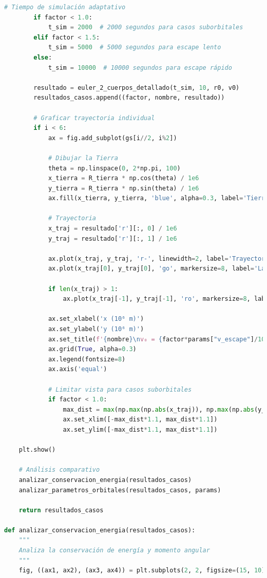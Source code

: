 \documentclass{article}
\begin{document}
\begin{lstlisting}[language=Python, caption={Análisis completo del sistema Tierra-nave}]
        # Tiempo de simulación adaptativo
        if factor < 1.0:
            t_sim = 2000  # 2000 segundos para casos suborbitales
        elif factor < 1.5:
            t_sim = 5000  # 5000 segundos para escape lento
        else:
            t_sim = 10000  # 10000 segundos para escape rápido
        
        resultado = euler_2_cuerpos_detallado(t_sim, 10, r0, v0)
        resultados_casos.append((factor, nombre, resultado))
        
        # Graficar trayectoria individual
        if i < 6:
            ax = fig.add_subplot(gs[i//2, i%2])
            
            # Dibujar la Tierra
            theta = np.linspace(0, 2*np.pi, 100)
            x_tierra = R_tierra * np.cos(theta) / 1e6
            y_tierra = R_tierra * np.sin(theta) / 1e6
            ax.fill(x_tierra, y_tierra, 'blue', alpha=0.3, label='Tierra')
            
            # Trayectoria
            x_traj = resultado['r'][:, 0] / 1e6
            y_traj = resultado['r'][:, 1] / 1e6
            
            ax.plot(x_traj, y_traj, 'r-', linewidth=2, label='Trayectoria')
            ax.plot(x_traj[0], y_traj[0], 'go', markersize=8, label='Lanzamiento')
            
            if len(x_traj) > 1:
                ax.plot(x_traj[-1], y_traj[-1], 'ro', markersize=8, label='Final')
            
            ax.set_xlabel('x (10⁶ m)')
            ax.set_ylabel('y (10⁶ m)')
            ax.set_title(f'{nombre}\nv₀ = {factor*params["v_escape"]/1000:.1f} km/s')
            ax.grid(True, alpha=0.3)
            ax.legend(fontsize=8)
            ax.axis('equal')
            
            # Limitar vista para casos suborbitales
            if factor < 1.0:
                max_dist = max(np.max(np.abs(x_traj)), np.max(np.abs(y_traj)))
                ax.set_xlim([-max_dist*1.1, max_dist*1.1])
                ax.set_ylim([-max_dist*1.1, max_dist*1.1])
    
    plt.show()
    
    # Análisis comparativo
    analizar_conservacion_energia(resultados_casos)
    analizar_parametros_orbitales(resultados_casos, params)
    
    return resultados_casos

def analizar_conservacion_energia(resultados_casos):
    """
    Analiza la conservación de energía y momento angular
    """
    fig, ((ax1, ax2), (ax3, ax4)) = plt.subplots(2, 2, figsize=(15, 10))
    

\end{lstlisting}
\end{document}
